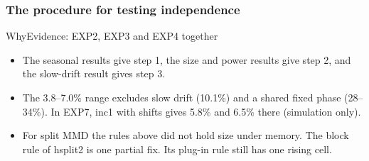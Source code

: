 \documentclass[11pt, aspectratio=169, xcolor={dvipsnames}]{beamer}
\newenvironment{why}[1]{\begin{block}{Why\hfill\normalfont\footnotesize Evidence: #1}\small
  \setlength{\leftmargini}{1.2em}}{\end{block}}
\begin{document}
\begin{frame}
\frametitle{The procedure for testing independence}
\begin{center}
\end{center}
\begin{why}{EXP2, EXP3 and EXP4 together}
\begin{itemize}
\item The seasonal results give step 1, the size and power results give step 2, and the slow-drift result gives step 3.
\item The 3.8--7.0\% range excludes slow drift (10.1\%) and a shared fixed phase (28--34\%). In EXP7, inc1 with shifts gives 5.8\% and 6.5\% there (simulation only).
\item For split MMD the rules above did not hold size under memory. The block rule of hsplit2 is one partial fix. Its plug-in rule still has one rising cell.
\end{itemize}
\end{why}
\end{frame}
\end{document}

